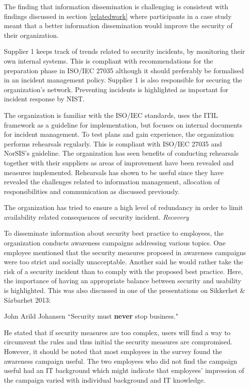 The finding that information dissemination is challenging is consistent with findings discussed in section \ref{relatedwork} where participants in a case study meant that a better information dissemination would improve the security of their organization. 

Supplier 1 keeps track of trends related to security incidents, by monitoring their own internal systems. This is compliant with recommendations for the preparation phase in ISO/IEC 27035 although it should preferably be formalised in an incident management policy. Supplier 1 is also responsible for securing the organization's network. Preventing incidents is highlighted as important for incident response by NIST.

The organization is familiar with the ISO/IEC standards, uses the ITIL framework as a guideline for implementation, but focuses on internal documents for incident management. To test plans and gain experience, the organization performs rehearsals regularly. This is compliant with ISO/IEC 27035 and NorSIS's guideline. The organization has seen benefits of conducting rehearsals together with their suppliers as areas of improvement have been revealed and measures implemented. Rehearsals has shown to be useful since they have revealed the challenges related to information management, allocation of responsibilities and communication as discussed previously.  

The organization has tried to ensure a high level of redundancy in order to limit availability related consequences of security incident. \textit{Recovery}

To disseminate information about security best practice to employees, the organization conducts awareness campaigns addressing various topics. One employee mentioned that the security measures proposed in awareness campaigns were too strict and socially unacceptable. Another said he would rather take the risk of a security incident than to comply with the proposed best practice. Here, the importance of having an appropriate balance between security and usability is highlighted. This was also discussed in one of the presentations on Sikkerhet \& S\aa rbarhet 2013:

\begin{newquote}{John Arild Johansen}
``Security must \textbf{never} stop business."
\end{newquote}

He stated that if security measures are too complex, users will find a way to circumvent the rules and thus initial the security measures are compromised. However, it should be noted that most employees in the survey found the awareness campaign useful. The two employees who did not find the campaign useful had an IT background which might indicate that employees' impression of the campaign varied with individual background and IT knowledge. 

